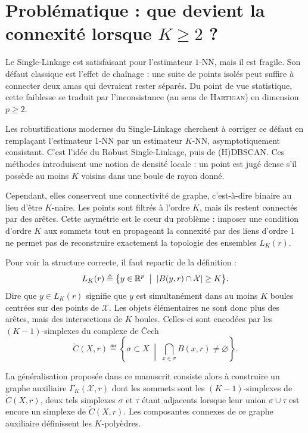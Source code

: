 \section{Problématique : que devient la connexité lorsque $K\geq2$ ?}

Le Single-Linkage est satisfaisant pour l'estimateur $1$-NN, mais il est fragile.
Son défaut classique est l'effet de chaînage : une suite de points isolés peut suffire à connecter deux amas qui devraient rester séparés. 
Du point de vue statistique, cette faiblesse se traduit par l'inconsistance (au sens de \textsc{Hartigan}) en dimension $p\geq2$.

Les robustifications modernes du Single-Linkage cherchent à corriger ce défaut en remplaçant l'estimateur $1$-NN par un estimateur $K$-NN, asymptotiquement consistant. 
C'est l'idée du Robust Single-Linkage, puis de (H)DBSCAN. 
Ces méthodes introduisent une notion de densité locale : un point est jugé dense s'il possède au moins $K$ voisins dans une boule de rayon donné.

Cependant, elles conservent une connectivité de graphe, c'est-à-dire binaire au lieu d'être $K$-naire. Les points sont filtrés à l'ordre $K$, mais ils restent connectés par des arêtes. Cette asymétrie est le cœur du problème : imposer une condition d'ordre $K$ aux sommets tout en propageant la connexité par des liens d'ordre $1$ ne permet pas de reconstruire exactement la topologie des ensembles $L_K(r)$.

Pour voir la structure correcte, il faut repartir de la définition :
\[
    L_K(r)
    \triangleq
    \bigl\{
        y\in\mathbb{R}^p
        \;\bigm|\;
        \lvert B(y,r)\cap \mathcal X \rvert \geq K
    \bigr\}.
\]
Dire que $y\in L_K(r)$ signifie que $y$ est simultanément dans au moins $K$ boules centrées sur des points de $\mathcal X$. 
Les objets élémentaires ne sont donc plus des arêtes, mais des intersections de $K$ boules. Celles-ci sont encodées par les $(K-1)$-simplexes du complexe de \v{C}ech
\[
    \check{C}(X,r)
    \eqdef
    \left\{
        \sigma\subset X
        \;\middle|\;
        \bigcap_{x\in\sigma} B(x,r) \neq \varnothing
    \right\}.
\]

La généralisation proposée dans ce manuscrit consiste alors à construire un graphe auxiliaire $\Gamma_K(\mathcal X,r)$ dont les sommets sont les $(K-1)$-simplexes de $\check{C}(X,r)$, deux tels simplexes $\sigma$ et $\tau$ étant adjacents lorsque leur union $\sigma\cup\tau$ est encore un simplexe de $\check{C}(X,r)$. 
Les composantes connexes de ce graphe auxiliaire définissent les $K$-polyèdres.

